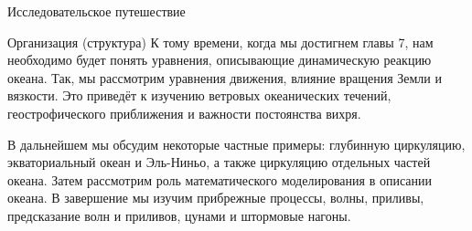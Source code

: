 \begin{chapter}{Исследовательское путешествие}
\begin{section}{Организация (структура)}
К тому времени, когда мы достигнем главы 7, нам необходимо будет понять 
уравнения, описывающие динамическую реакцию океана. Так, мы рассмотрим 
уравнения движения, влияние вращения Земли и вязкости. Это приведёт к 
изучению ветровых океанических течений, геострофического приближения и важности 
постоянства вихря.
%

В дальнейшем мы обсудим некоторые частные примеры: глубинную циркуляцию, 
экваториальный океан и Эль-Ниньо, а также циркуляцию отдельных частей океана. 
Затем рассмотрим роль математического моделирования в описании океана. 
В завершение мы изучим прибрежные процессы, волны, приливы, предсказание волн 
и приливов, цунами и штормовые нагоны.
%
\end{section}


\end{chapter}
